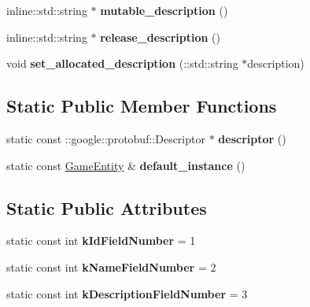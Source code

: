 \begin{DoxyCompactItemize}
\item 
\hypertarget{class_game_entity_ad3928cb09cd351152f0d61bde3b177d8}{}inline\+::std\+::string $\ast$ {\bfseries mutable\+\_\+description} ()\label{class_game_entity_ad3928cb09cd351152f0d61bde3b177d8}

\item 
\hypertarget{class_game_entity_ad6ddcad96329b910af7708d7fe195fd2}{}inline\+::std\+::string $\ast$ {\bfseries release\+\_\+description} ()\label{class_game_entity_ad6ddcad96329b910af7708d7fe195fd2}

\item 
\hypertarget{class_game_entity_a0247fb1afaf6f4c78e556613ca878206}{}void {\bfseries set\+\_\+allocated\+\_\+description} (\+::std\+::string $\ast$description)\label{class_game_entity_a0247fb1afaf6f4c78e556613ca878206}

\end{DoxyCompactItemize}
\subsection*{Static Public Member Functions}
\begin{DoxyCompactItemize}
\item 
\hypertarget{class_game_entity_a96a51564257590278f571b71836b7b0f}{}static const \+::google\+::protobuf\+::\+Descriptor $\ast$ {\bfseries descriptor} ()\label{class_game_entity_a96a51564257590278f571b71836b7b0f}

\item 
\hypertarget{class_game_entity_ab5cdaf2b5b95f303770216e9c84ea5b5}{}static const \hyperlink{class_game_entity}{Game\+Entity} \& {\bfseries default\+\_\+instance} ()\label{class_game_entity_ab5cdaf2b5b95f303770216e9c84ea5b5}

\end{DoxyCompactItemize}
\subsection*{Static Public Attributes}
\begin{DoxyCompactItemize}
\item 
\hypertarget{class_game_entity_aa83493bf7e483e028cb07bffe1dfdd27}{}static const int {\bfseries k\+Id\+Field\+Number} = 1\label{class_game_entity_aa83493bf7e483e028cb07bffe1dfdd27}

\item 
\hypertarget{class_game_entity_a965f608a057f6571cb60ac889572608a}{}static const int {\bfseries k\+Name\+Field\+Number} = 2\label{class_game_entity_a965f608a057f6571cb60ac889572608a}

\item 
\hypertarget{class_game_entity_adecaf52bd2eb80bfa8564744a5e4252b}{}static const int {\bfseries k\+Description\+Field\+Number} = 3\label{class_game_entity_adecaf52bd2eb80bfa8564744a5e4252b}

\end{DoxyCompactItemize}
